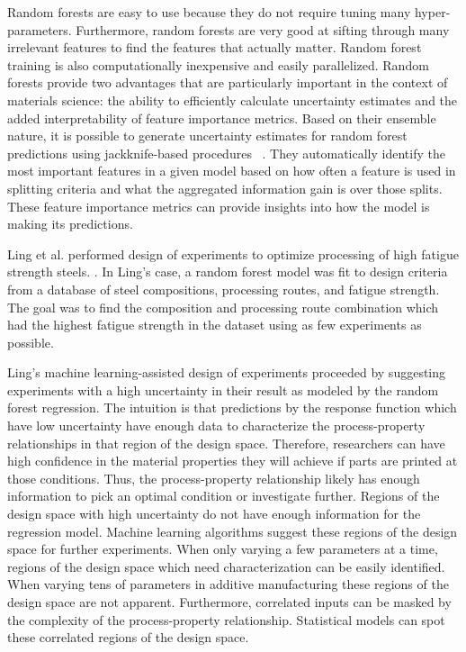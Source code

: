 Random forests are easy to use because they do not require tuning many hyper-parameters. Furthermore, random forests are very good at sifting through many irrelevant features to find the features that actually matter. Random forest training is also computationally inexpensive and easily parallelized. Random forests provide two advantages that are particularly important in the context of materials science: the ability to efficiently calculate uncertainty estimates and the added interpretability of feature importance metrics. Based on their ensemble nature, it is possible to generate uncertainty estimates for random forest predictions using jackknife-based procedures ~\cite{Efron1992, Efron2014, Wager2014}. They automatically identify the most important features in a given model based on how often a feature is used in splitting criteria and what the aggregated information gain is over those splits. These feature importance metrics can provide insights into how the model is making its predictions. 

Ling et al. performed design of experiments to optimize processing of high fatigue strength steels. \cite{Ling2017a}. In Ling's case, a random forest model was fit to design criteria from a database of steel compositions, processing routes, and fatigue strength. The goal was to find the composition and processing route combination which had the highest fatigue strength in the dataset using as few experiments as possible.

Ling's machine learning-assisted design of experiments proceeded by suggesting experiments with a high uncertainty in their result as modeled by the random forest regression. The intuition is that predictions by the response function which have low uncertainty have enough data to characterize the process-property relationships in that region of the design space. Therefore, researchers can have high confidence in the material properties they will achieve if parts are printed at those conditions. Thus, the process-property relationship likely has enough information to pick an optimal condition or investigate further. Regions of the design space with high uncertainty do not have enough information for the regression model. Machine learning algorithms suggest these regions of the design space for further experiments. When only varying a few parameters at a time, regions of the design space which need characterization can be easily identified. When varying tens of parameters in additive manufacturing these regions of the design space are not apparent. Furthermore, correlated inputs can be masked by the complexity of the process-property relationship. Statistical models can spot these correlated regions of the design space.

